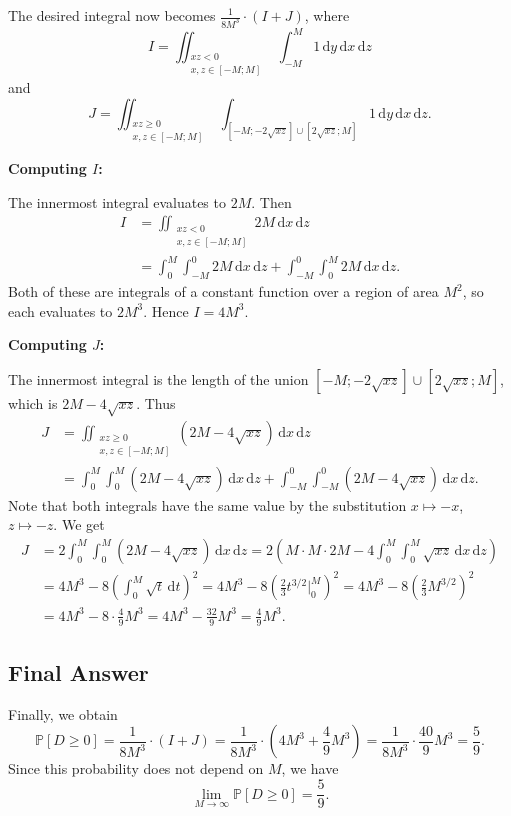 \documentclass[a4paper,12pt]{report}
\begin{document}
The desired integral now becomes $\frac{1}{8M^3}\cdot(I+J)$, where
\[
I=\iint_{\substack{xz < 0 \\ x,z\in[-M;M]}}\int_{-M}^{M} 1\,\mathrm{d}y\,\mathrm{d}x\,\mathrm{d}z
\]
and
\[
J=\iint_{\substack{xz \ge 0 \\ x,z\in[-M;M]}}\int_{[-M;-2\sqrt{xz}]\cup[2\sqrt{xz};M]} 1\,\mathrm{d}y\,\mathrm{d}x\,\mathrm{d}z.
\]

\medskip
\noindent\textbf{Computing $I$:}

The innermost integral evaluates to $2M$. Then
\begin{align*}
I&=\iint_{\substack{xz < 0 \\ x,z\in[-M;M]}}2M\,\mathrm{d}x\,\mathrm{d}z\\
&=\int_{0}^M\int_{-M}^0 2M \,\mathrm{d}x\,\mathrm{d}z+ \int_{-M}^0\int_{0}^M 2M\,\mathrm{d}x\,\mathrm{d}z.
\end{align*}
Both of these are integrals of a constant function over a region of area $M^2$, so each evaluates to $2M^3$. Hence $I=4M^3$.

\medskip
\noindent\textbf{Computing $J$:}

The innermost integral is the length of the union $[-M;-2\sqrt{xz}]\cup[2\sqrt{xz};M]$, which is $2M-4\sqrt{xz}$. Thus
\begin{align*}
J&=\iint_{\substack{xz \ge 0 \\ x,z\in[-M;M]}}(2M-4\sqrt{xz})\,\mathrm{d}x\,\mathrm{d}z\\
&=\int_{0}^M\int_{0}^M (2M-4\sqrt{xz}) \,\mathrm{d}x\,\mathrm{d}z+ \int_{-M}^0\int_{-M}^0 (2M-4\sqrt{xz})\,\mathrm{d}x\,\mathrm{d}z.
\end{align*}
Note that both integrals have the same value by the substitution $x\mapsto -x$, $z\mapsto -z$. 
We get
\begin{align*}
J&=2\int_{0}^M\int_{0}^M (2M-4\sqrt{xz}) \,\mathrm{d}x\,\mathrm{d}z =2\left(M \cdot M\cdot 2M - 4\int_{0}^M\int_{0}^M\sqrt{xz}\,\mathrm{d}x\,\mathrm{d}z\right)\\
&=4M^3-8\left(\int_{0}^M\sqrt{t}\,\mathrm{d}t\right)^2 =4M^3-8\left( \frac{2}{3} t^{3/2} \bigg|_0^M \right)^2=4M^3-8\left(\frac{2}{3}M^{3/2}\right)^2\\
&=4M^3-8\cdot\frac{4}{9}M^3=4M^3-\frac{32}{9}M^3=\frac{4}{9}M^3.
\end{align*}

\subsection*{Final Answer}

Finally, we obtain
\[
\mathbb{P}[D\ge0]=\frac{1}{8M^3}\cdot(I+J)=\frac{1}{8M^3}\cdot\left(4M^3+\frac{4}{9}M^3\right)=\frac{1}{8M^3}\cdot\frac{40}{9}M^3=\frac{5}{9}.
\]
Since this probability does not depend on $M$, we have
\[
\lim_{M\to\infty} \mathbb{P}[D\ge0]=\boxed{\frac{5}{9}}.
\]
\end{document}
